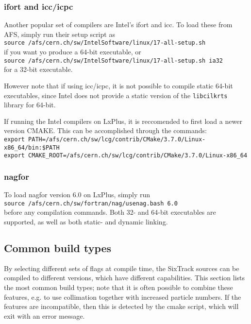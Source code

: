 \documentclass[english]{article}
\begin{document}

\subsubsection{ifort and icc/icpc}
Another popular set of compilers are Intel's ifort and icc.
To load these from AFS, simply run their setup script as\\
{\small
  \texttt{source /afs/cern.ch/sw/IntelSoftware/linux/17-all-setup.sh}\\
}
if you want yo produce a 64-bit executable, or\\
{\small
  \texttt{source /afs/cern.ch/sw/IntelSoftware/linux/17-all-setup.sh~ia32}\\
}
for a 32-bit executable.

However note that if using icc/icpc, it is not possible to compile static 64-bit executables, since Intel does not provide a static version of the \texttt{libcilkrts} library for 64-bit.

If running the Intel compilers on LxPlus, it is reccomended to first load a newer version CMAKE.
This can be accomplished through the commands:\\
{\scriptsize
  \texttt{export PATH=/afs/cern.ch/sw/lcg/contrib/CMake/3.7.0/Linux-x86\_64/bin:\$PATH}\\
  \texttt{export CMAKE\_ROOT=/afs/cern.ch/sw/lcg/contrib/CMake/3.7.0/Linux-x86\_64}
}

\subsubsection{nagfor}

To load nagfor version 6.0 on LxPlus, simply run\\
\texttt{source /afs/cern.ch/sw/fortran/nag/usenag.bash 6.0}\\
before any compilation commands.
Both 32- and 64-bit executables are supported, as well as both static- and dynamic linking.


\subsection{Common build types}
\label{sec:building:options}
By selecting different sets of flags at compile time, the SixTrack sources can be compiled to different versions, which have different capabilities.
This section lists the most common build types; note that it is often possible to combine these features, e.g. to use collimation together with increased particle numbers.
If the features are incompatible, then this is detected by the cmake script, which will exit with an error message.
\end{document}
